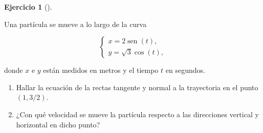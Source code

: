 \documentclass[
  spanish,
  a4paper,
]{scrreport}
\theoremstyle{definition}
\newtheorem{exercise}{Ejercicio}[chapter]
\theoremstyle{remark}
\begin{document}
\begin{exercise}[]\protect\hypertarget{exr-cinematica-tangente-normal-trayectoria}{}\label{exr-cinematica-tangente-normal-trayectoria}

Una partícula se mueve a lo largo de la curva

\[
\begin{cases}
x = 2\operatorname{sen}(t), \\
y = \sqrt{3}\cos(t),
\end{cases}
\]

donde \(x\) e \(y\) están medidos en metros y el tiempo \(t\) en
segundos.

\begin{enumerate}
\def\labelenumi{\alph{enumi}.}
\item
  Hallar la ecuación de la rectas tangente y normal a la trayectoria en
  el punto \((1,3/2)\).
\item
  ¿Con qué velocidad se mueve la partícula respecto a las direcciones
  vertical y horizontal en dicho punto?
\end{enumerate}

\end{exercise}
\end{document}
